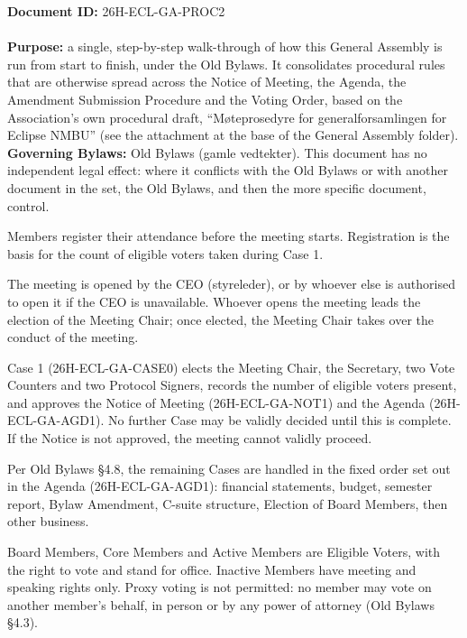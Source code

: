 \documentclass{../../../Common/Latex/Templates/rapport}
\date{\meetingdate, \meetingtime}
\begin{document}
\makecoverpage
\tableofcontents
\reportmainmatter

\noindent\textbf{Document ID:} 26H-ECL-GA-PROC2\\
\meetingline\\
\textbf{Purpose:} a single, step-by-step walk-through of how this General Assembly is run from start to finish, under the Old Bylaws. It consolidates procedural rules that are otherwise spread across the Notice of Meeting, the Agenda, the Amendment Submission Procedure and the Voting Order, based on the Association's own procedural draft, ``Møteprosedyre for generalforsamlingen for Eclipse NMBU'' (see the attachment at the base of the General Assembly folder).\\
\textbf{Governing Bylaws:} Old Bylaws (gamle vedtekter). This document has no independent legal effect: where it conflicts with the Old Bylaws or with another document in the set, the Old Bylaws, and then the more specific document, control.

Members register their attendance before the meeting starts. Registration is the basis for the count of eligible voters taken during Case 1.

The meeting is opened by the CEO (styreleder), or by whoever else is authorised to open it if the CEO is unavailable. Whoever opens the meeting leads the election of the Meeting Chair; once elected, the Meeting Chair takes over the conduct of the meeting.

Case 1 (26H-ECL-GA-CASE0) elects the Meeting Chair, the Secretary, two Vote Counters and two Protocol Signers, records the number of eligible voters present, and approves the Notice of Meeting (26H-ECL-GA-NOT1) and the Agenda (26H-ECL-GA-AGD1). No further Case may be validly decided until this is complete. If the Notice is not approved, the meeting cannot validly proceed.

Per Old Bylaws \S4.8, the remaining Cases are handled in the fixed order set out in the Agenda (26H-ECL-GA-AGD1): financial statements, budget, semester report, Bylaw Amendment, C-suite structure, Election of Board Members, then other business.

Board Members, Core Members and Active Members are Eligible Voters, with the right to vote and stand for office. Inactive Members have meeting and speaking rights only. Proxy voting is not permitted: no member may vote on another member's behalf, in person or by any power of attorney (Old Bylaws \S4.3).
\end{document}
